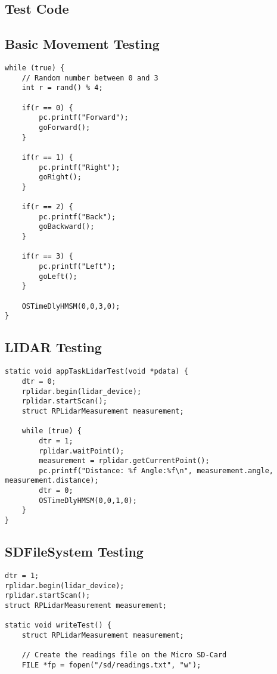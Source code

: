 \begin{appendices}
		\section{Test Code}
		\label{testing:testcode}
			\subsection{Basic Movement Testing}
			\label{testcode:movementbasic}
			\begin{lstlisting}
while (true) {
	// Random number between 0 and 3
	int r = rand() % 4;
					
	if(r == 0) {
		pc.printf("Forward");
		goForward();
	}
					
	if(r == 1) {
		pc.printf("Right");
		goRight();
	}
					
	if(r == 2) {
		pc.printf("Back");
		goBackward();
	}
					
	if(r == 3) {
		pc.printf("Left");
		goLeft();
	}

	OSTimeDlyHMSM(0,0,3,0);
}
			\end{lstlisting}
			
			\subsection{LIDAR Testing}
			\label{testcode:observation1}
			\begin{lstlisting}
static void appTaskLidarTest(void *pdata) {
	dtr = 0;
	rplidar.begin(lidar_device);
	rplidar.startScan();
	struct RPLidarMeasurement measurement;
				
	while (true) {
		dtr = 1;
		rplidar.waitPoint();
		measurement = rplidar.getCurrentPoint();
		pc.printf("Distance: %f Angle:%f\n", measurement.angle, measurement.distance);
		dtr = 0;
		OSTimeDlyHMSM(0,0,1,0);
	}
}
			\end{lstlisting}
			
			\subsection{SDFileSystem Testing}
			\label{testcode:filewriting2}
			\begin{lstlisting}
dtr = 1;
rplidar.begin(lidar_device);
rplidar.startScan();
struct RPLidarMeasurement measurement;
				
static void writeTest() {
	struct RPLidarMeasurement measurement;

	// Create the readings file on the Micro SD-Card
	FILE *fp = fopen("/sd/readings.txt", "w");
					

\end{lstlisting}
\end{appendices}
